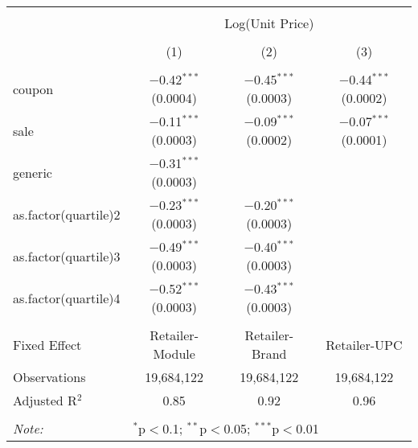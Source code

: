 
\begin{table}[!htbp] \centering 
  \caption{} 
  \label{tab:overallSavingsNonStorable} 
\begin{tabular}{@{\extracolsep{5pt}}lccc} 
\\[-1.8ex]\hline 
\hline \\[-1.8ex] 
 & \multicolumn{3}{c}{Log(Unit Price)} \\ 
\\[-1.8ex] & (1) & (2) & (3)\\ 
\hline \\[-1.8ex] 
 coupon & $-$0.42$^{***}$ (0.0004) & $-$0.45$^{***}$ (0.0003) & $-$0.44$^{***}$ (0.0002) \\ 
  sale & $-$0.11$^{***}$ (0.0003) & $-$0.09$^{***}$ (0.0002) & $-$0.07$^{***}$ (0.0001) \\ 
  generic & $-$0.31$^{***}$ (0.0003) &  &  \\ 
  as.factor(quartile)2 & $-$0.23$^{***}$ (0.0003) & $-$0.20$^{***}$ (0.0003) &  \\ 
  as.factor(quartile)3 & $-$0.49$^{***}$ (0.0003) & $-$0.40$^{***}$ (0.0003) &  \\ 
  as.factor(quartile)4 & $-$0.52$^{***}$ (0.0003) & $-$0.43$^{***}$ (0.0003) &  \\ 
 \hline \\[-1.8ex] 
Fixed Effect & Retailer-Module & Retailer-Brand & Retailer-UPC \\ 
Observations & 19,684,122 & 19,684,122 & 19,684,122 \\ 
Adjusted R$^{2}$ & 0.85 & 0.92 & 0.96 \\ 
\hline 
\hline \\[-1.8ex] 
\textit{Note:}  & \multicolumn{3}{l}{$^{*}$p$<$0.1; $^{**}$p$<$0.05; $^{***}$p$<$0.01} \\ 
\end{tabular} 
\end{table} 
